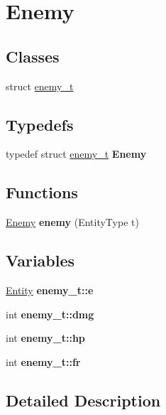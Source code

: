 \hypertarget{group__Enemy}{}\section{Enemy}
\label{group__Enemy}
\subsection*{Classes}
\begin{DoxyCompactItemize}
\item 
struct \hyperlink{structenemy__t}{enemy\+\_\+t}
\end{DoxyCompactItemize}
\subsection*{Typedefs}
\begin{DoxyCompactItemize}
\item 
\mbox{\label{group__Enemy_gaad589070b2e0dde2bd2bca54139c5d78}} 
typedef struct \hyperlink{structenemy__t}{enemy\+\_\+t} {\bfseries Enemy}
\end{DoxyCompactItemize}
\subsection*{Functions}
\begin{DoxyCompactItemize}
\item 
\mbox{\label{group__Enemy_ga4018d0b05b994871c2820981f5ad768d}} 
\hyperlink{structenemy__t}{Enemy} {\bfseries enemy} (Entity\+Type t)
\end{DoxyCompactItemize}
\subsection*{Variables}
\begin{DoxyCompactItemize}
\item 
\mbox{\label{group__Enemy_ga4b4b0f1459e31f84e26a5e4d69803afe}} 
\hyperlink{structentity__t}{Entity} {\bfseries enemy\+\_\+t\+::e}
\item 
\mbox{\label{group__Enemy_gad893b6dc13539e0609746f087571dcab}} 
int {\bfseries enemy\+\_\+t\+::dmg}
\item 
\mbox{\label{group__Enemy_gaf1b95c1e37e5b2707b7d77ec1924a520}} 
int {\bfseries enemy\+\_\+t\+::hp}
\item 
\mbox{\label{group__Enemy_ga6152c864718befb67875835d7e03a2b3}} 
int {\bfseries enemy\+\_\+t\+::fr}
\end{DoxyCompactItemize}


\subsection{Detailed Description}
